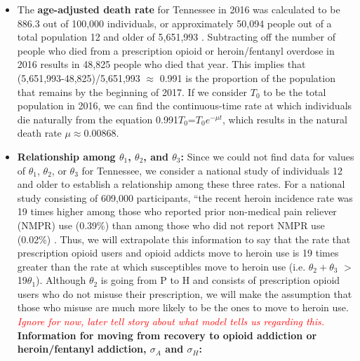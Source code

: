 \documentclass[12pt]{article}
\begin{document}
\begin{itemize}
\item The \textbf{age-adjusted death rate} for Tennessee in 2016 was calculated to be 886.3 out of 100,000 individuals, or approximately 50,094 people out of a total population 12 and older of 5,651,993 \cite{Kaiser}. Subtracting off the number of people who died from a prescription opioid or heroin/fentanyl overdose in 2016 results in 48,825 people who died that year. This implies that (5,651,993-48,825)/5,651,993 $\approx$ 0.991 is the proportion of the population that remains by the beginning of 2017. If we consider $T_0$ to be the total population in 2016, we can find the continuous-time rate at which individuals die naturally from the equation 0.991$T_0$=$T_0e^{-\mu t}$, which results in the natural death rate $\mu \approx 0.00868$.



\item \textbf{Relationship among $\theta_1$, $\theta_2$, and $\theta_3$:} Since we could not find data for values of $\theta_1$, $\theta_2$, or $\theta_3$ for Tennessee, we consider a national study of individuals 12 and older to establish a relationship among these three rates. For a national study consisting of 609,000 participants, ``the recent heroin incidence rate was 19 times higher among those who reported prior non-medical pain reliever (NMPR) use (0.39\%) than among those who did not report NMPR use (0.02\%) \cite{Muhuri}.
Thus, we will extrapolate this information to say that the rate that prescription opioid users and opioid addicts move to heroin use is 19 times greater than the rate at which susceptibles move to heroin use (i.e. $\theta_2 + \theta_3$ $>$ 19$\theta_1$). Although $\theta_2$ is going from P to H and consists of prescription opioid users who do not misuse their prescription, we will make the assumption that those who misuse are much more likely to be the ones to move to heroin use. \\

\textcolor{red}{\emph{Ignore for now, later tell story about what model tells us regarding this.}} \\
\textbf{Information for moving from recovery to opioid addiction or heroin/fentanyl addiction, $\sigma_A$ and $\sigma_H$:} 


\end{itemize}
\end{document}
